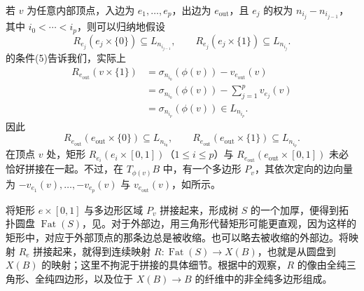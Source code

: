 若 $v$ 为任意内部顶点，入边为 $e_1,\ldots,e_p$，出边为 $e_{\mathrm{out}}$，且 $e_j$ 的权为 $n_{i_j}-n_{i_{j-1}}$，其中 $i_0<\cdots<i_p$，则可以归纳地假设
\[
R_{e_j}(e_j\times\{0\})\subseteq L_{n_{i_{j-1}}},
\qquad
R_{e_j}(e_j\times\{1\})\subseteq L_{n_{i_j}}.
\]
的条件(5)告诉我们，实际上
\[
\begin{aligned}
R_{e_{\mathrm{out}}}(v\times\{1\})
&=\sigma_{n_{i_0}}(\phi(v))-v_{e_{\mathrm{out}}}(v)\\
&=\sigma_{n_{i_0}}(\phi(v))-\sum_{j=1}^p v_{e_j}(v)\\
&=\sigma_{n_{i_p}}(\phi(v))\in L_{n_{i_p}}.
\end{aligned}
\]
因此
\[
R_{e_{\mathrm{out}}}(e_{\mathrm{out}}\times\{0\})\subseteq L_{n_{i_0}},
\qquad
R_{e_{\mathrm{out}}}(e_{\mathrm{out}}\times\{1\})\subseteq L_{n_{i_p}}.
\]
在顶点 $v$ 处，矩形 $R_{e_i}(e_i\times[0,1])$（$1\leq i\leq p$）与 $R_{e_{\mathrm{out}}}(e_{\mathrm{out}}\times[0,1])$ 未必恰好拼接在一起。不过，在 $T_{\phi(v)}B$ 中，有一个多边形 $P_v$，其依次定向的边向量为 $-v_{e_1}(v),\ldots,-v_{e_p}(v)$ 与 $v_{e_{\mathrm{out}}}(v)$，如所示。

将矩形 $e\times[0,1]$ 与多边形区域 $P_v$ 拼接起来，形成树 $S$ 的一个加厚，便得到拓扑圆盘 $\operatorname{Fat}(S)$，见。对于外部边，用三角形代替矩形可能更直观，因为这样的矩形中，对应于外部顶点的那条边总是被收缩。也可以略去被收缩的外部边。将映射 $R_e$ 拼接起来，就得到连续映射 $R\colon\operatorname{Fat}(S)\to X(B)$，也就是从圆盘到 $X(B)$ 的映射；这里不拘泥于拼接的具体细节。根据中的观察，$R$ 的像由全纯三角形、全纯四边形，以及位于 $X(B)\to B$ 的纤维中的非全纯多边形组成。
\begin{figure}[H]
\centering
{}
\BookNumberOnlyCaption\label{fig:8.32}
\end{figure}
\begin{figure}[H]
\centering
{}
\BookNumberOnlyCaption\label{fig:8.33}
\end{figure}

